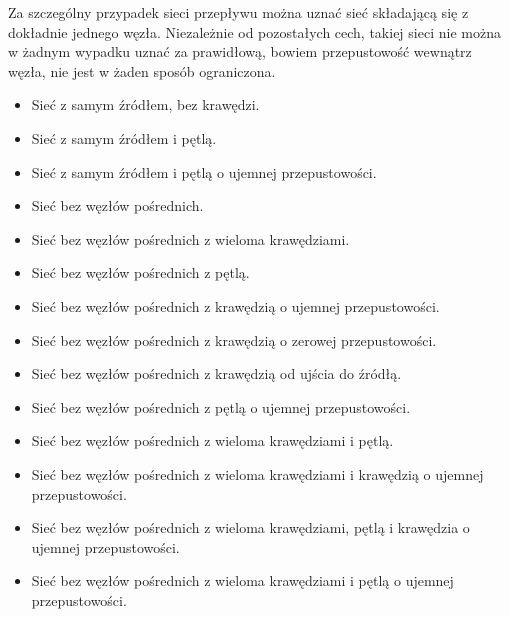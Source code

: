 \documentclass[10pt]{dokument-tiwo}
\begin{document}
Za szczególny przypadek sieci przepływu można uznać sieć składającą się z dokładnie jednego węzła. Niezależnie od pozostałych cech, takiej sieci nie można w żadnym wypadku uznać za prawidłową, bowiem przepustowość wewnątrz węzła, nie jest w żaden sposób ograniczona.
\begin{itemize}
    \item Sieć z samym źródłem, bez krawędzi.
    \item Sieć z samym źródłem i pętlą.
    \item Sieć z samym źródłem i pętlą o ujemnej przepustowości.
\end{itemize}
\begin{itemize}
    \item Sieć bez węzłów pośrednich.
    \item Sieć bez węzłów pośrednich z wieloma krawędziami.
    \item Sieć bez węzłów pośrednich z pętlą.
    \item Sieć bez węzłów pośrednich z krawędzią o ujemnej przepustowości.
    \item Sieć bez węzłów pośrednich z krawędzią o zerowej przepustowości.
    \item Sieć bez węzłów pośrednich z krawędzią od ujścia do źródłą.
    \item Sieć bez węzłów pośrednich z pętlą o ujemnej przepustowości.
    \item Sieć bez węzłów pośrednich z wieloma krawędziami i pętlą.
    \item Sieć bez węzłów pośrednich z wieloma krawędziami i krawędzią o ujemnej przepustowości.
    \item Sieć bez węzłów pośrednich z wieloma krawędziami, pętlą i krawędzia o ujemnej przepustowości.
    \item Sieć bez węzłów pośrednich z wieloma krawędziami i pętlą o ujemnej przepustowości.   
\end{itemize}
\end{document}
